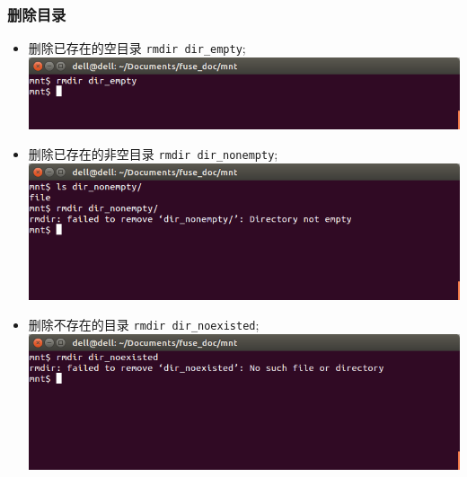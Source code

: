 \documentclass[nofonts, titlepage]{ctexart}
\begin{document}
\subsubsection{删除目录}
\begin{itemize}
\item
  删除已存在的空目录 \texttt{rmdir dir\_empty};\\
  \includegraphics[width=14cm]{./images/./rmdir_t1.png}
\item
  删除已存在的非空目录 \texttt{rmdir dir\_nonempty};\\
  \includegraphics[width=14cm]{./images/./rmdir_t2.png}
\item
  删除不存在的目录 \texttt{rmdir dir\_noexisted};\\
  \includegraphics[width=14cm]{./images/./rmdir_t3.png}
\end{itemize}
\end{document}
